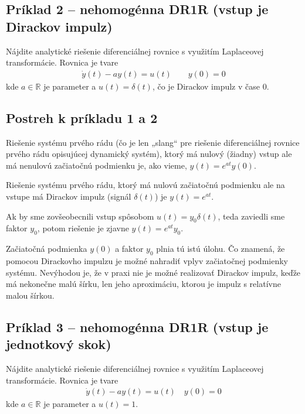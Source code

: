 \documentclass[a4paper, 10pt, ]{article}
\begin{document}
\subsection{Príklad 2 --  nehomogénna DR1R (vstup je Dirackov impulz)}
\label{s1pr2}

Nájdite analytické riešenie diferenciálnej rovnice s využitím Laplaceovej transformácie. Rovnica je tvare
\begin{align}
    \dot y(t) - a y(t) = u(t) \qquad y(0) = 0
\end{align}
kde $a \in \mathbb R$ je parameter a $u(t) = \delta(t)$, čo je Dirackov impulz v čase $0$.



\subsection{Postreh k príkladu 1 a 2}

Riešenie systému prvého rádu (čo je len „slang“ pre riešenie diferenciálnej rovnice prvého rádu opisujúcej dynamický systém), ktorý má nulový (žiadny) vstup ale má nenulovú začiatočnú podmienku je, ako vieme, $y(t) = e^{at} y(0)$.

Riešenie systému prvého rádu, ktorý má nulovú začiatočnú podmienku ale na vstupe má Dirackov impulz (signál $\delta(t)$) je $y(t) = e^{at}$.

Ak by sme zovšeobecnili vstup spôsobom $u(t) = y_0 \delta(t)$, teda zaviedli sme faktor $y_0$, potom riešenie je zjavne $y(t) = e^{at} y_0 $. 

Začiatočná podmienka $y(0)$ a faktor $y_0$ plnia tú istú úlohu. Čo znamená, že pomocou Dirackovho impulzu je možné nahradiť vplyv začiatočnej podmienky systému. Nevýhodou je, že v praxi nie je možné realizovať Dirackov impulz, keďže má nekonečne malú šírku, len jeho aproximáciu, ktorou je impulz s relatívne malou šírkou.




\subsection{Príklad 3 --  nehomogénna DR1R (vstup je jednotkový skok)}
\label{s1pr3}

Nájdite analytické riešenie diferenciálnej rovnice s využitím Laplaceovej transformácie. Rovnica je tvare
\begin{align}
    \dot y(t) - a y(t) = u(t) \quad y(0) = 0
\end{align}
kde $a \in \mathbb R$ je parameter a $u(t) = 1$.
\end{document}
